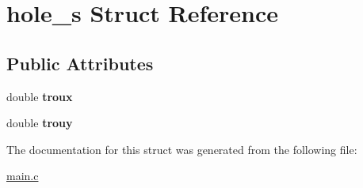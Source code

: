 \hypertarget{structhole__s}{\section{hole\-\_\-s Struct Reference}
\label{structhole__s}
}
\subsection*{Public Attributes}
\begin{DoxyCompactItemize}
\item 
\hypertarget{structhole__s_a797d6e7e437f73feee937e9db1607710}{double {\bfseries troux}}\label{structhole__s_a797d6e7e437f73feee937e9db1607710}

\item 
\hypertarget{structhole__s_a1324778aea13703d99a6d325e9d8af84}{double {\bfseries trouy}}\label{structhole__s_a1324778aea13703d99a6d325e9d8af84}

\end{DoxyCompactItemize}


The documentation for this struct was generated from the following file\-:\begin{DoxyCompactItemize}
\item 
\hyperlink{main_8c}{main.\-c}\end{DoxyCompactItemize}
